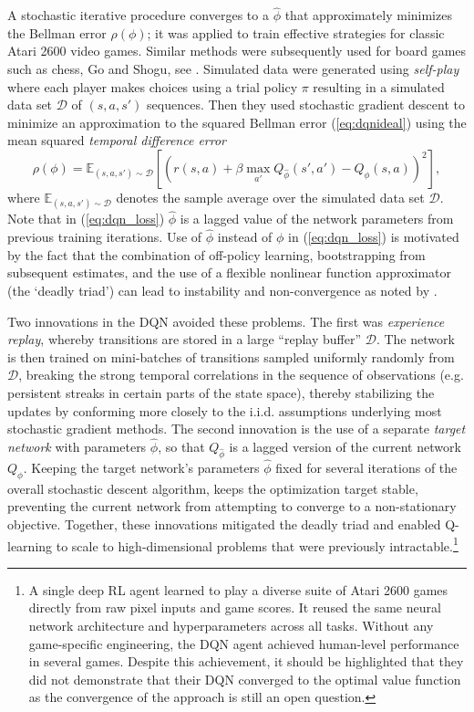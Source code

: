 A stochastic iterative procedure \citep{mnih:2015} converges to a $\hat\phi$ that
approximately minimizes the Bellman error $\rho(\phi)$; it was applied to train effective strategies
for classic Atari 2600 video games. Similar methods were subsequently used for
board games such as chess, Go and Shogu, see \citet{Silver:2018}. Simulated data were generated using {\it self-play\/} where
each player makes choices using a trial policy $\pi$ resulting in 
a simulated data set $\mathcal{D}$ of $(s,a,s')$ sequences. Then they used  stochastic gradient descent to minimize 
an approximation to the squared Bellman error (\ref{eq:dqnideal}) using the mean squared {\it temporal difference error\/}
\begin{equation}
      \rho(\phi) = \mathbb{E}_{(s,a,s')\sim\mathcal{D}} \left[ \left(r(s,a) + \beta \max_{a'} Q_{\hat\phi}(s', a') - Q_\phi(s, a) \right)^2 \right],
\label{eq:dqn_loss}
\end{equation}
where $\mathbb{E}_{(s,a,s')\sim\mathcal{D}}$ denotes the sample average over the simulated data set $\mathcal{D}$.
Note that in (\ref{eq:dqn_loss}) $\hat\phi$ is a lagged value of the network parameters from
previous training iterations. Use of $\hat\phi$ instead of $\phi$ in (\ref{eq:dqn_loss}) is motivated by the fact that
the combination of off-policy learning, bootstrapping from subsequent estimates, and the use of a 
flexible nonlinear function approximator (the `deadly triad') can lead to instability and non-convergence
as noted by \citet{BartoSutton:1998}. 

Two innovations in the DQN avoided these problems.  
The first was \textit{experience replay}, whereby transitions are stored in a large ``replay buffer'' $\mathcal{D}$. 
The network is then trained on mini-batches of transitions sampled uniformly randomly from $\mathcal{D}$, breaking 
the strong temporal correlations in the sequence of observations (e.g. persistent streaks in certain parts of the state space), 
thereby stabilizing the updates by conforming more closely to the i.i.d. assumptions underlying most stochastic gradient methods.
The second innovation is the use of a separate \textit{target network} with parameters $\hat\phi$,  so
that  $Q_{\hat\phi}$  is a lagged version of the current network $Q_\phi$.
Keeping the target network's parameters
$\hat\phi$ fixed for several iterations of the overall stochastic descent algorithm, keeps the optimization target stable,
preventing the current network from attempting to converge to a non-stationary objective. 
Together, these innovations mitigated the deadly triad and enabled Q-learning to scale to high-dimensional problems that 
were previously intractable.\footnote{\footnotesize 
A single deep RL agent learned to play a diverse suite of Atari 2600 games \citep{mnih:2015} directly from raw pixel inputs and game scores. It reused the same neural 
network architecture and hyperparameters across all tasks. Without any game-specific engineering, the DQN agent 
achieved human-level performance in several games. Despite this achievement, 
it should be highlighted that they did not demonstrate that their DQN converged to the optimal value function as
the convergence of the approach is still an open question.}

